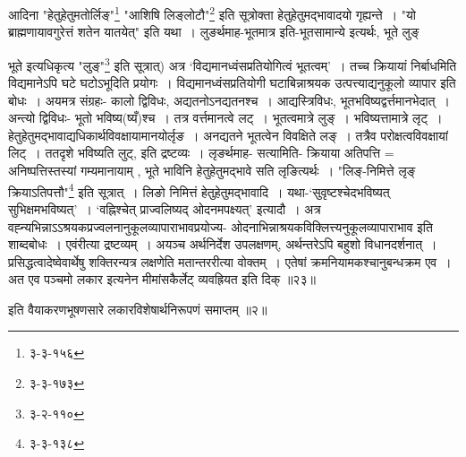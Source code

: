 {{{ आदिना "हेतुहेतुमतोर्लिङ्"\footnote{३-३-१५६} "आशिषि लिङ्लोटौ"\footnote{३-३-१७३} इति सूत्रोक्ता हेतुहेतुमद्भावादयो गृह्यन्ते~।
"यो ब्राह्मणायावगुरेत्तं शतेन यातयेत्" इति यथा~।
 लुङर्थमाह-भूतमात्र इति-भूतसामान्ये इत्यर्थः, भूते लुङ् {भूते इत्यधिकृत्य "लुङ्"\footnote{३-२-११०} इति सूत्रात्) अत्र `विद्यमानध्वंसप्रतियोगित्वं भूतत्वम्'~।
तच्च क्रियायां निर्बाधमिति विद्यमानेऽपि घटे घटोऽभूदिति प्रयोगः~।
विद्यमानध्वंसप्रतियोगी घटाबिन्नाश्रयक उत्पत्त्याद्यनुकूलो व्यापार इति बोधः~।
 अयमत्र संग्रहः- कालो द्विविधः, अद्यतनोऽनद्यतनश्च~।
आद्यस्त्रिविधः, भूतभविष्यद्वर्त्तमानभेदात्~।
अन्त्यो द्विविधः- भूतो भविष्य(ष्यँ)श्च~।
तत्र वर्त्तमानत्वे लट्~।
भूतत्वमात्रे लुङ्~।
भविष्यत्तामात्रे लृट्~।
हेतुहेतुमद्भावाद्यधिकार्थविवक्षायामानयोर्लृङ~।
अनद्यतने भूतत्वेन विवक्षिते लङ्~।
तत्रैव परोक्षत्वविवक्षायां लिट्~।
ततदृशे भविष्यति लुट्, इति द्रष्टव्यः~। 
 लृङर्थमाह- सत्यामिति- क्रियाया अतिपत्ति = अनिष्पत्तिस्तस्यां गम्यमानायाम् , भूते भाविनि हेतुहेतुमद्भावे सति लृङित्यर्थः~।
"लिङ्-निमित्ते लृङ् क्रियाऽतिपत्तौ"\footnote{३-३-१३८} इति सूत्रात्~।
लिङो निमित्तं हेतुहेतुमद्भावादि~।
यथा-`सुवृष्टश्चेदभविष्यत् सुभिक्षमभविष्यत्'~।
`वह्निश्चेत् प्राज्वलिष्यद् ओदनमपक्ष्यत्' इत्यादौ~।
अत्र वह्न्यभिन्नाऽऽश्रयकप्रज्वलनानुकूलव्यापाराभावप्रयोज्य- ओदनाभिन्नाश्रयकविक्लित्त्यनुकूलव्यापाराभाव इति शाब्दबोधः~।
 एवंरीत्या द्रष्टव्यम्~।
अयञ्च अर्थनिर्देश उपलक्षणम्, अर्थन्तरेऽपि बहुशो विधानदर्शनात्~।
प्रसिद्धत्वादेष्वेवार्थेषु शक्तिरन्यत्र लक्षणेति मतान्तररीत्या वोक्तम्~।
एतेषां क्रमनियामकश्चानुबन्धक्रम एव~।
अत एव पञ्चमो लकार इत्यनेन मीमांसकैर्लेट् व्यवह्रियत इति दिक् ॥२३॥\par
\begin{center} इति वैयाकरणभूषणसारे लकारविशेषार्थनिरूपणं समाप्तम् ॥२॥ \end{center}





}}}}
